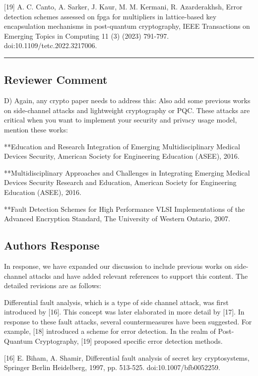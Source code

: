 [19] A. C. Canto, A. Sarker, J. Kaur, M. M. Kermani, R. Azarderakhsh, Error detection schemes assessed on fpga for multipliers in lattice-based key encapsulation mechanisms in post-quantum cryptography, IEEE Transactions on Emerging Topics in Computing 11 (3) (2023) 791-797. doi:10.1109/tetc.2022.3217006.

\color{black}

\noindent\rule{\linewidth}{2.0pt}

\subsection{Reviewer Comment}
D) Again, any crypto paper needs to address this: Also add some previous works on side-channel attacks and lightweight cryptography or PQC. These attacks are critical when you want to implement your security and privacy usage model, mention these works:

**Education and Research Integration of Emerging Multidisciplinary Medical Devices Security, American Society for Engineering Education (ASEE), 2016.

**Multidisciplinary Approaches and Challenges in Integrating Emerging Medical Devices Security Research and Education, American Society for Engineering Education (ASEE), 2016.

**Fault Detection Schemes for High Performance VLSI Implementations of the Advanced Encryption Standard, The University of Western Ontario, 2007.



\subsection{Authors Response}

In response, we have expanded our discussion to include previous works on side-channel attacks and have added relevant references to support this content. The detailed revisions are as follows:

\color{blue}

Differential fault analysis, which is a type of side channel attack, was first introduced by [16]. This concept was later elaborated in more detail by [17]. In response to these fault attacks, several countermeasures have been suggested. For example, [18] introduced a scheme for error detection. In the realm of Post-Quantum Cryptography, [19] proposed specific error detection methods.

	[16] E. Biham, A. Shamir, Differential fault analysis of secret key cryptosystems, Springer Berlin Heidelberg, 1997, pp. 513-525. doi:10.1007/bfb0052259.


